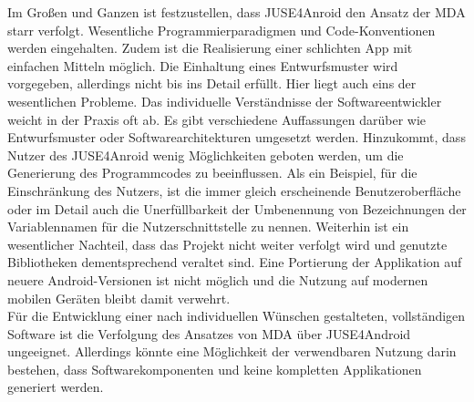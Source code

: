 \documentclass[a4paper,twoside]{article}
\begin{document}
Im Großen und Ganzen ist festzustellen, dass JUSE4Anroid den Ansatz der MDA starr verfolgt. Wesentliche Programmierparadigmen und Code-Konventionen werden eingehalten. Zudem ist die Realisierung einer schlichten App mit einfachen Mitteln möglich. Die Einhaltung eines Entwurfsmuster wird vorgegeben, allerdings nicht bis ins Detail erfüllt. Hier liegt auch eins der wesentlichen Probleme. Das individuelle Verständnisse der Softwareentwickler weicht in der Praxis oft ab. Es gibt verschiedene Auffassungen darüber wie Entwurfsmuster oder Softwarearchitekturen umgesetzt werden. Hinzukommt, dass Nutzer des JUSE4Anroid wenig Möglichkeiten geboten werden, um die Generierung des Programmcodes zu beeinflussen. Als ein Beispiel, für die Einschränkung des Nutzers, ist die immer gleich erscheinende Benutzeroberfläche oder im Detail auch die Unerfüllbarkeit der Umbenennung von Bezeichnungen der Variablennamen für die Nutzerschnittstelle zu nennen. Weiterhin ist ein wesentlicher Nachteil, dass das Projekt nicht weiter verfolgt wird und genutzte Bibliotheken dementsprechend veraltet sind. Eine Portierung der Applikation auf neuere Android-Versionen ist nicht möglich und die Nutzung auf modernen mobilen Geräten bleibt damit verwehrt.
\\

Für die Entwicklung einer nach individuellen Wünschen gestalteten, vollständigen Software ist die Verfolgung des Ansatzes von MDA über JUSE4Android ungeeignet. Allerdings könnte eine Möglichkeit der verwendbaren Nutzung darin bestehen, dass Softwarekomponenten und keine kompletten Applikationen generiert werden.

\vfill

{\small
}
\newpage
\onecolumn
\end{document}
